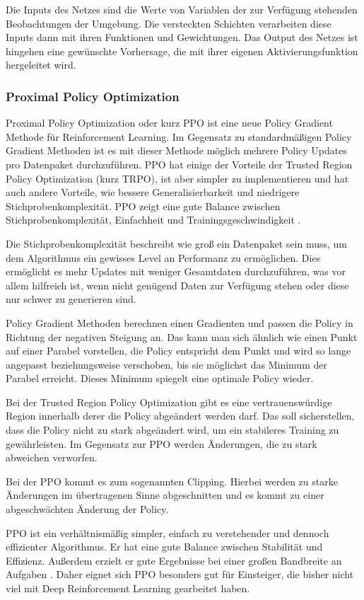 Die Inputs des Netzes sind die Werte von Variablen der zur Verfügung stehenden Beobachtungen der Umgebung. Die versteckten Schichten verarbeiten diese Inputs dann mit ihren Funktionen und Gewichtungen. Das Output des Netzes ist hingehen eine gewünschte Vorhersage, die mit ihrer eigenen Aktivierungsfunktion hergeleitet wird.
\subsubsection{Proximal Policy Optimization}
Proximal Policy Optimization oder kurz PPO ist eine neue Policy Gradient Methode für Reinforcement Learning. Im Gegensatz zu standardmäßigen Policy Gradient Methoden ist es mit dieser Methode möglich mehrere Policy Updates pro Datenpaket durchzuführen. PPO hat einige der Vorteile der Trusted Region Policy Optimization (kurz TRPO), ist aber simpler zu implementieren und hat auch andere Vorteile, wie bessere Generalisierbarkeit und niedrigere Stichprobenkomplexität. PPO zeigt eine gute Balance zwischen Stichprobenkomplexität, Einfachheit und Trainingsgeschwindigkeit \cite[Seite 1]{schulman_proximal_2017}.

Die Stichprobenkomplexität beschreibt wie groß ein Datenpaket sein muss, um dem Algorithmus ein gewisses Level an Performanz zu ermöglichen. Dies ermöglicht es mehr Updates mit weniger Gesamtdaten durchzuführen, was vor allem hilfreich ist, wenn nicht genügend Daten zur Verfügung stehen oder diese nur schwer zu generieren sind.

Policy Gradient Methoden berechnen einen Gradienten und passen die Policy in Richtung der negativen Steigung an. Das kann man sich ähnlich wie einen Punkt auf einer Parabel vorstellen, die Policy entspricht dem Punkt und wird so lange angepasst beziehungsweise verschoben, bis sie möglichst das Minimum der Parabel erreicht. Dieses Minimum spiegelt eine optimale Policy wieder.

Bei der Trusted Region Policy Optimization gibt es eine vertrauenswürdige Region innerhalb derer die Policy abgeändert werden darf. Das soll sicherstellen, dass die Policy nicht zu stark abgeändert wird, um ein stabileres Training zu gewährleisten. Im Gegensatz zur PPO werden Änderungen, die zu stark abweichen verworfen.

Bei der PPO kommt es zum sogenannten Clipping. Hierbei werden zu starke Änderungen im übertragenen Sinne abgeschnitten und es kommt zu einer abgeschwächten Änderung der Policy.

PPO ist ein verhältnismäßig simpler, einfach zu verstehender und dennoch effizienter Algorithmus. Er hat eine gute Balance zwischen Stabilität und Effizienz. Außerdem erzielt er gute Ergebnisse bei einer großen Bandbreite an Aufgaben \cite{schulman_proximal_2017}. Daher eignet sich PPO besonders gut für Einsteiger, die bisher nicht viel mit Deep Reinforcement Learning gearbeitet haben.
